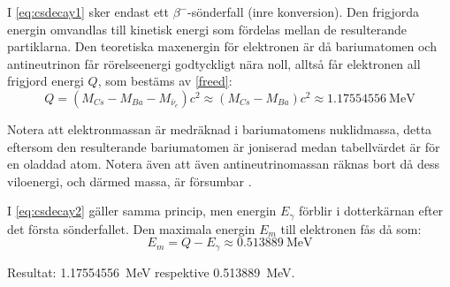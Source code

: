 I \eqref{eq:csdecay1} sker endast ett $\beta^-$-sönderfall (inre konversion).
Den frigjorda energin omvandlas till kinetisk energi som fördelas mellan de
resulterande partiklarna. Den teoretiska maxenergin för elektronen är då
bariumatomen och antineutrinon får rörelseenergi godtyckligt nära noll, alltså
får elektronen all frigjord energi $Q$, som bestäms av \eqref{freed}:
%
\begin{equation}
    Q = (M_{Cs} - M_{Ba} - M_{\bar{\nu}_e})c^2 \approx (M_{Cs} - M_{Ba})c^2 \approx \qty{1.17554556}{\MeV}
\end{equation}

Notera att elektronmassan är medräknad i bariumatomens nuklidmassa, detta
eftersom den resulterande bariumatomen är joniserad medan tabellvärdet är
för en oladdad atom. Notera även att även antineutrinomassan räknas bort då
dess viloenergi, och därmed massa, är försumbar .

I \eqref{eq:csdecay2} gäller samma princip, men energin $E_\gamma$ förblir i
dotterkärnan efter det första sönderfallet. Den maximala energin $E_m$ till
elektronen fås då som:
%
\begin{equation}
    E_m = Q - E_\gamma \approx \qty{0.513889}{\MeV}
\end{equation}

Resultat: \qty{1.17554556}{\MeV} respektive \qty{0.513889}{\MeV}.
